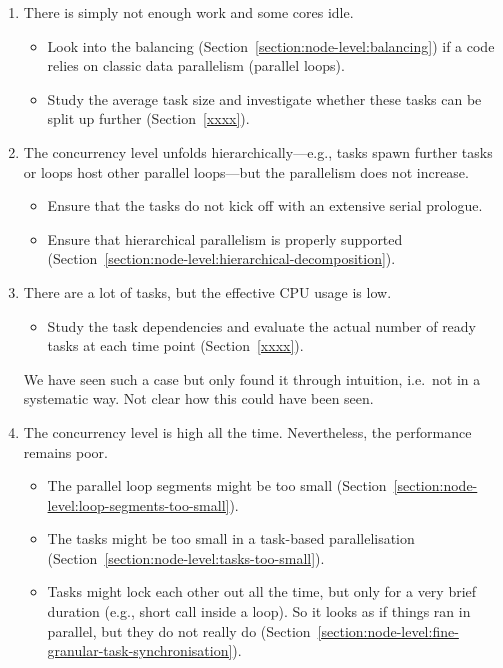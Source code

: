 \begin{enumerate}[noitemsep]
  \item[$\boxtimes$] There is simply not enough work and some cores idle.
    \begin{itemize}[noitemsep] 
      \item[$\Rightarrow $] Look into the balancing (Section~\ref{section:node-level:balancing}) if a code relies on classic data parallelism (parallel loops).
      \item[$\Rightarrow $] Study the average task size and investigate whether these tasks can be split up further (Section~\ref{xxxx}).
    \end{itemize}
  \item[$\boxtimes$] The concurrency level unfolds hierarchically---e.g., tasks spawn further tasks or loops host other parallel loops---but the parallelism does not increase.
    \begin{itemize}[noitemsep]
      \item[$\Rightarrow $] Ensure that the tasks do not kick off with an extensive serial prologue.
      \item[$\Rightarrow $] Ensure that hierarchical parallelism is properly supported (Section~\ref{section:node-level:hierarchical-decomposition}).
    \end{itemize}
  \item[$\boxtimes$] There are a lot of tasks, but the effective CPU usage is low.
    \begin{itemize}[noitemsep]
      \item[$\Rightarrow $] Study the task dependencies and evaluate the actual number of ready tasks at each time point (Section~\ref{xxxx}). 
    \end{itemize}
    \begin{wip}
     We have seen such a case but only found it through intuition, i.e.~not in a systematic way. Not clear how this could have been seen.
    \end{wip}
  \item[$\boxtimes$] The concurrency level is high all the time. Nevertheless, the performance remains poor.
    \begin{itemize}[noitemsep]
      \item[$\Rightarrow $] The parallel loop segments might be too small (Section~\ref{section:node-level:loop-segments-too-small}).
      \item[$\Rightarrow $] The tasks might be too small in a task-based parallelisation (Section~\ref{section:node-level:tasks-too-small}).
      \item[$\Rightarrow $] Tasks might lock each other out all the time, but only for a very brief duration (e.g., short call inside a loop). So it looks as if things ran in parallel, but they do not really do (Section~\ref{section:node-level:fine-granular-task-synchronisation}).
    \end{itemize}
\end{enumerate}


